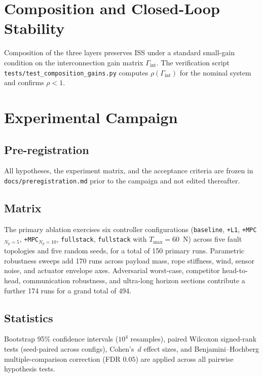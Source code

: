 \documentclass[journal,twocolumn,10pt]{IEEEtran}
\begin{document}
\section{Composition and Closed-Loop Stability}
\label{sec:composition}

Composition of the three layers preserves ISS under a standard
small-gain condition on the interconnection gain matrix
$\Gamma_\text{int}$. The verification script
\texttt{tests/test\_composition\_gains.py} computes
$\rho(\Gamma_\text{int})$ for the nominal system and confirms
$\rho<1$.

\section{Experimental Campaign}
\label{sec:experiments}

\subsection{Pre-registration}
All hypotheses, the experiment matrix, and the acceptance criteria
are frozen in \texttt{docs/preregistration.md} prior to the campaign
and not edited thereafter.

\subsection{Matrix}
The primary ablation exercises six controller configurations
(\texttt{baseline}, \texttt{+L1}, \texttt{+MPC}$_{N_p=5}$,
\texttt{+MPC}$_{N_p=10}$, \texttt{fullstack},
\texttt{fullstack} with $T_\text{max}=60$~N) across five fault
topologies and five random seeds, for a total of 150 primary runs.
Parametric robustness sweeps add 170 runs across payload mass, rope
stiffness, wind, sensor noise, and actuator envelope axes.
Adversarial worst-case, competitor head-to-head, communication
robustness, and ultra-long horizon sections contribute a further 174
runs for a grand total of 494.

\subsection{Statistics}
Bootstrap 95\% confidence intervals ($10^4$ resamples), paired
Wilcoxon signed-rank tests (seed-paired across configs), Cohen's~$d$
effect sizes, and Benjamini--Hochberg multiple-comparison correction
(FDR $0.05$) are applied across all pairwise hypothesis tests.
\end{document}

